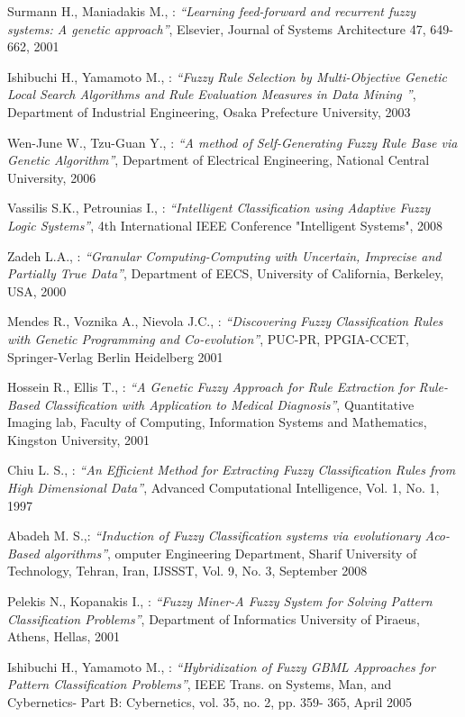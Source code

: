 \begin{thebibliography}{99}
	Surmann H., Maniadakis M., : \textit{``Learning feed-forward and recurrent fuzzy systems: A genetic approach''}, 
    Elsevier, Journal of Systems Architecture 47, 649-662, 2001

	Ishibuchi H., Yamamoto M., : \textit{``Fuzzy Rule Selection by Multi-Objective Genetic Local Search Algorithms and Rule Evaluation Measures in Data Mining ''}, 
    Department of Industrial Engineering, Osaka Prefecture University, 2003

	Wen-June W., Tzu-Guan Y., : \textit{``A method of Self-Generating Fuzzy Rule Base via Genetic
Algorithm''}, Department of Electrical Engineering, National Central University, 2006

	Vassilis S.K., Petrounias I., : \textit{``Intelligent Classification using Adaptive
Fuzzy Logic Systems''}, 4th International IEEE Conference "Intelligent Systems", 2008

	Zadeh L.A., : \textit{``Granular Computing-Computing with Uncertain,
    Imprecise and Partially True Data''}, Department of EECS, University of
    California, Berkeley, USA, 2000

	Mendes R., Voznika A., Nievola J.C., : \textit{``Discovering Fuzzy Classification Rules with Genetic Programming and Co-evolution''}, 
    PUC-PR, PPGIA-CCET, Springer-Verlag Berlin Heidelberg 2001

    Hossein R., Ellis T., : \textit{``A Genetic Fuzzy Approach for Rule Extraction for Rule-Based Classification with Application to Medical Diagnosis''}, 
    Quantitative Imaging lab, Faculty of Computing, Information Systems and
    Mathematics, Kingston University, 2001

	Chiu L. S., : \textit{``An Efficient Method for Extracting Fuzzy Classification Rules from High Dimensional Data''}, 
    Advanced Computational Intelligence, Vol. 1, No. 1, 1997

	Abadeh M. S.,: \textit{``Induction of Fuzzy Classification systems via
    evolutionary Aco-Based algorithms''}, omputer Engineering Department,
    Sharif University of Technology, Tehran, Iran, IJSSST, Vol. 9, No. 3, September 2008

	Pelekis N., Kopanakis I., : \textit{``Fuzzy Miner-A Fuzzy System for Solving Pattern Classification Problems''}, 
    Department of Informatics University of Piraeus, Athens, Hellas, 2001

	Ishibuchi H., Yamamoto M., : \textit{``Hybridization of Fuzzy GBML Approaches for Pattern Classification Problems''}, 
    IEEE Trans. on Systems, Man, and Cybernetics- Part B: Cybernetics, vol. 35, no. 2, pp. 359- 365, April 2005


\end{thebibliography}
